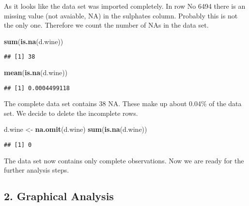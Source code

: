 \documentclass[
]{article}
\newenvironment{Shaded}{\begin{snugshade}}{\end{snugshade}}
\newcommand{\KeywordTok}[1]{\textcolor[rgb]{0.13,0.29,0.53}{\textbf{#1}}}
\newcommand{\NormalTok}[1]{#1}
\newcommand{\StringTok}[1]{\textcolor[rgb]{0.31,0.60,0.02}{#1}}
\begin{document}
As it looks like the data set was imported completely. In row No 6494
there is an missing value (not avaiable, NA) in the sulphates column.
Probably this is not the only one. Therefore we count the number of NAs
in the data set.

\begin{Shaded}
\begin{Highlighting}[]
\KeywordTok{sum}\NormalTok{(}\KeywordTok{is.na}\NormalTok{(d.wine))}
\end{Highlighting}
\end{Shaded}

\begin{verbatim}
## [1] 38
\end{verbatim}

\begin{Shaded}
\begin{Highlighting}[]
\KeywordTok{mean}\NormalTok{(}\KeywordTok{is.na}\NormalTok{(d.wine))}
\end{Highlighting}
\end{Shaded}

\begin{verbatim}
## [1] 0.0004499118
\end{verbatim}

The complete data set contains 38 NA. These make up about 0.04\% of the
data set. We decide to delete the incomplete rows.

\begin{Shaded}
\begin{Highlighting}[]
\NormalTok{d.wine <-}\StringTok{ }\KeywordTok{na.omit}\NormalTok{(d.wine)}
\KeywordTok{sum}\NormalTok{(}\KeywordTok{is.na}\NormalTok{(d.wine))}
\end{Highlighting}
\end{Shaded}

\begin{verbatim}
## [1] 0
\end{verbatim}

The data set now contains only complete observations. Now we are ready
for the further analysis steps.

\hypertarget{graphical-analysis}{%
\subsection{2. Graphical Analysis}\label{graphical-analysis}}
\end{document}
